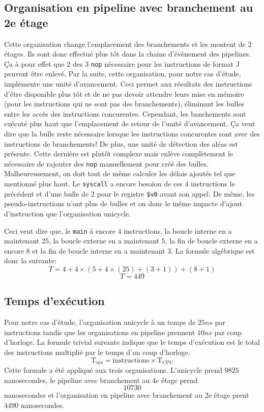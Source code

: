 \documentclass[a11paper]{article}
\newcommand{\todo}[1]{\begin{color}{Red}\textbf{TODO:} #1\end{color}}
\begin{document}
\subsection{Organisation en pipeline avec branchement au 2e étage}
Cette organisation change l'emplacement des branchements et les montent de $2$ étages. Ils sont donc effectué plus tôt dans la chaine d'évènement des pipelines. Ça à pour effet que
$2$ des $3$ \verb|nop| nécessaire pour les instructions de format J peuvent être enlevé. Par la suite, cette organisation, pour notre cas d'étude, implémente une unité d'avancement.
Ceci permet aux résultats des instructions d'être disponible plus tôt et de ne pas devoir attendre leurs mise en mémoire (pour les instructions qui ne sont pas des branchements), 
éliminant les bulles entre les accès des instructions concurentes. Cependant, les banchements sont exécuté plus haut que l'emplacement de retour de l'unité d'avancement. Ça veut dire
que la bulle reste nécessaire lorsque les instructions concurentes sont avec des instructions de branchements!
De plus, une unité de détection des aléas est présente. Cette dernière est plutôt complexe mais enlève 
complètement le nécessaire de rajouter des \verb|nop| manuellement pour créé des bulles. Malheureusement, on doit tout de même calculer les délais ajoutés tel que mentionné plus haut.
Le \verb|syscall| a encore besoion de ces $4$ instructions le précédent et d'une bulle de $2$ pour le registre \verb|$v0| avant son appel. De même, les pseudo-instructions n'ont plus
de bulles et on donc le même impacte d'ajout d'instruction que l'organisation unicycle.

Ceci veut dire que, le \verb|main| à encore $4$ instructions, la boucle interne en a maintenant $25$, la boucle externe en a maintenant $5$, la fin de boucle externe en a encore $8$
et la fin de boucle interne en a maintenant $3$. La formule algébrique est donc la suivante:
$$
T = 4+ 4\times(5+4\times(25)+(3+1)) + (8+1)
$$
$$
T = 449
$$

\subsection{Temps d'exécution}
Pour notre cas d'étude, l'organisation unicycle à un temps de $25ns$ par instructions tandis que les organisations en pipeline prennent $10ns$ par coup d'horloge.
La formule trivial suivante indique que le temps d'exécution est le total des instructions multiplié par le temps d'un coup d'horloge.
$$
\text{T}_{\text{sys}} = \text{instructions}\times\text{T}_{\text{CPU}}
$$
Cette formule a été appliqué aux trois organisations. L'unicycle prend $9825$ nanosecondes, le pipeline avec branchement au 4e étage prend $$10730$$ nanosecondes et l'organisation en pipeline
avec branchement au 2e étage prent $4490$ nanosecondes.
\end{document}
